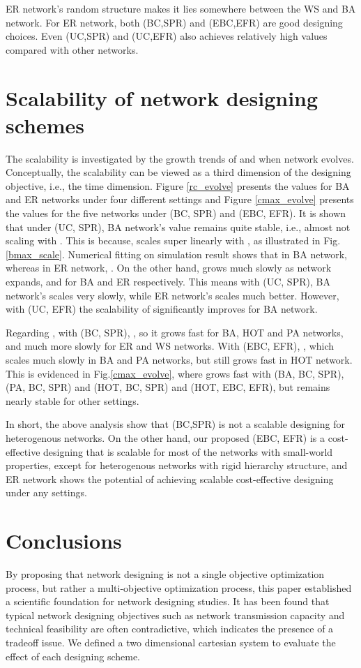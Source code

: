 \documentclass[journal]{IEEEtran}
\begin{document}
{ER network's random structure makes it lies somewhere between the WS
and BA network. For ER network, both (BC,SPR) and (EBC,EFR) are good
designing choices. Even (UC,SPR) and (UC,EFR) also achieves
relatively high  values compared with other networks.





\section{Scalability of network designing
schemes}\label{scalability} The scalability is investigated by the
growth trends of  and  when network evolves.
Conceptually, the scalability can be viewed as a third dimension of
the designing objective, i.e., the time dimension. Figure
\ref{rc_evolve} presents the  values for BA and ER networks
under four different settings and Figure \ref{cmax_evolve} presents
the  values for the five networks under (BC, SPR) and (EBC,
EFR). It is shown that under (UC, SPR), BA network's  value
remains quite stable, i.e., almost not scaling with . This is
because,  scales super linearly with , as illustrated in
Fig. \ref{bmax_scale}. Numerical fitting on simulation result shows
that  in BA network, whereas in ER network,
. On the other hand,  grows
much slowly as network expands,  and  for BA and ER respectively. This means with (UC, SPR), BA
network's  scales very slowly, while ER network's  scales
much better. However, with (UC, EFR) the scalability of 
significantly improves for BA network.

Regarding , with (BC, SPR), , so it
grows fast for BA, HOT and PA networks, and much more slowly for ER
and WS networks. With (EBC, EFR), ,
which scales much slowly in BA and PA networks, but still grows fast
in HOT network. This is evidenced in Fig.\ref{cmax_evolve}, where
 grows fast with (BA, BC, SPR), (PA, BC, SPR) and (HOT, BC,
SPR) and (HOT, EBC, EFR), but remains nearly stable for other
settings.

In short, the above analysis show that (BC,SPR) is not a scalable
designing for heterogenous networks. On the other hand, our proposed
(EBC, EFR) is a cost-effective designing that is scalable for most
of the networks with small-world properties, except for heterogenous
networks with rigid hierarchy structure, and ER network shows the
potential of achieving scalable cost-effective designing under any
settings.


 \section{Conclusions}\label{conclusion}
By proposing that network designing is not a single objective
optimization process, but rather a multi-objective optimization
process, this paper established a scientific foundation for network
designing studies. It has been found that typical network designing
objectives such as network transmission capacity and technical
feasibility are often contradictive, which indicates the presence of
a tradeoff issue. We defined a two dimensional cartesian system to
evaluate the effect of each designing scheme.

}
\end{document}
